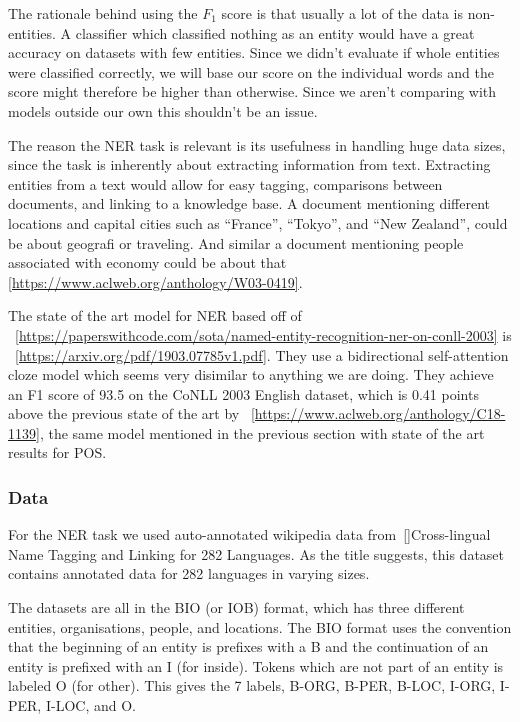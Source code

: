The rationale behind using the $F_1$ score is that usually a lot of the data is
non-entities. A classifier which classified nothing as an entity would have a
great accuracy on datasets with few entities. Since we didn't evaluate if whole
entities were classified correctly, we will base our score on the individual
words and the score might therefore be higher than otherwise. Since we aren't
comparing with models outside our own this shouldn't be an issue.

The reason the NER task is relevant is its usefulness in handling huge data
sizes, since the task is inherently about extracting information from text.
Extracting entities from a text would allow for easy tagging, comparisons
between documents, and linking to a knowledge base. A document mentioning
different locations and capital cities such as ``France'', ``Tokyo'', and ``New
Zealand'', could be about geografi or traveling. And similar a document
mentioning people associated with economy could be about that
\ref{https://www.aclweb.org/anthology/W03-0419}. 

The state of the art model for NER based off of
~\ref{https://paperswithcode.com/sota/named-entity-recognition-ner-on-conll-2003}
is ~\ref{https://arxiv.org/pdf/1903.07785v1.pdf}. They use a bidirectional
self-attention cloze model which seems very disimilar to anything we are doing.
They achieve an F1 score of 93.5 on the CoNLL 2003 English dataset, which is
0.41 points above the previous state of the art by
~\ref{https://www.aclweb.org/anthology/C18-1139}, the same model mentioned in
the previous section with state of the art results for POS.

\subsubsection{Data}\label{sec:experiments-ner-data}

For the NER task we used auto-annotated wikipedia data from~\ref{}{Cross-lingual
Name Tagging and Linking for 282 Languages}. As the title suggests, this dataset
contains annotated data for 282 languages in varying sizes. 

The datasets are all in the BIO (or IOB) format, which has three different
entities, organisations, people, and locations. The BIO format uses the
convention that the beginning of an entity is prefixes with a B and the
continuation of an entity is prefixed with an I (for inside). Tokens which are
not part of an entity is labeled O (for other). This gives the 7 labels, B-ORG,
B-PER, B-LOC, I-ORG, I-PER, I-LOC, and O. 

